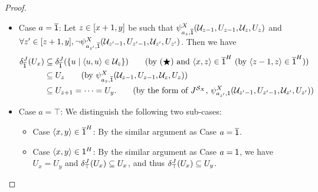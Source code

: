 \begin{proof}
\begin{itemize}
\begin{itemize}
               \item Case $a = \overline{\mathsf{1}}$:
                     Let $z \in [x + 1, y]$ be such that
                     $\fml[2]_{a_{z}, \com{\id}}^{\Aset}(\mathcal{U}_{z - 1}, U_{z - 1}, \mathcal{U}_{z} , U_{z})$ and
                     $\forall z' \in \range{z+1, y}, \lnot \fml[2]_{a_{z'}, \com{\id}}^{\Aset}(\mathcal{U}_{z' - 1}, U_{z' - 1}, \mathcal{U}_{z'} , U_{z'})$.
                     Then we have
                     \begin{align*}
                            \delta_{\com{\id}}^{\graph[3]}(U_{x}) &\subseteq \delta_{\com{\id}}^{\graph[3]}(\set{u \mid \tuple{u, u} \in \mathcal{U}_{z}}) \tag{by ($\bigstar$) and $\tuple{x, z} \in \com{\id}^{\graph[2]}$ (by $\tuple{z -1, z} \in \com{\id}^{\graph[2]}$)}\\
                            &\subseteq U_{z} \tag{by $\fml[2]_{a_{z}, \com{\id}}^{\Aset}(\mathcal{U}_{z - 1}, U_{z - 1}, \mathcal{U}_{z} , U_{z})$}\\
                            &\subseteq U_{z+1} = \dots = U_{y}. \tag{by the form of $\graph[3]^{\FillS_{\Aset}}$, $\fml[2]_{a_{z'}, \id}^{\Aset}(\mathcal{U}_{z' - 1}, U_{z' - 1}, \mathcal{U}_{z'} , U_{z'})$}
                     \end{align*}

               \item Case $a = \top$: We distinguish the following two sub-cases:
                     \begin{itemize}
                     \item Case $\tuple{x, y} \in \com{\id}^{\graph[2]}$:
                     By the similar argument as Case $a = \overline{\mathsf{1}}$.
                     \item Case $\tuple{x, y} \in \id^{\graph[2]}$:
                     By the similar argument as Case $a = \mathsf{1}$, we have $U_{x} = U_{y}$ and $\delta_{\top}^{\graph[3]}(U_{x}) \subseteq U_{x}$, and thus $\delta_{\top}^{\graph[3]}(U_{x}) \subseteq U_{y}$.
                     \end{itemize}


\end{itemize}
\end{itemize}
\end{proof}
